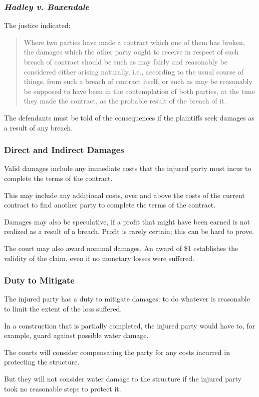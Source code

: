 \begin{frame}
\frametitle{\textit{Hadley v. Baxendale}}

The justice indicated:

\begin{quote}
Where two parties have made a contract which one of them has broken, the damages which the other party ought to receive in respect of such breach of contract should be such as may fairly and reasonably be considered either arising naturally, i.e., according to the usual course of things, from such a breach of contract itself, or such as may be reasonably be supposed to have been in the contemplation of both parties, at the time they made the contract, as the probable result of the breach of it.
\end{quote}

The defendants must be told of the consequences if the plaintiffs seek damages as a result of any breach. 

\end{frame}



\begin{frame}
\frametitle{Direct and Indirect Damages}

Valid damages include any immediate costs that the injured party must incur to complete the terms of the contract.

This may include any additional costs, over and above the costs of the current contract to find another party to complete the terms of the contract.

Damages may also be speculative, if a profit that might have been earned is not realized as a result of a breach. Profit is rarely certain; this can be hard to prove.

The court may also award \alert{nominal damages}. An award of \$1 establishes the validity of the claim, even if no monetary losses were suffered.

\end{frame}


\begin{frame}
\frametitle{Duty to Mitigate}

The injured party has a \alert{duty to mitigate} damages: to do whatever is reasonable to limit the extent of the loss suffered.

In a construction that is partially completed, the injured party would have to, for example, guard against possible water damage.

The courts will consider compensating the party for any costs incurred in protecting the structure. 

But they will not consider water damage to the structure if the injured party took no reasonable steps to protect it.

\end{frame}



